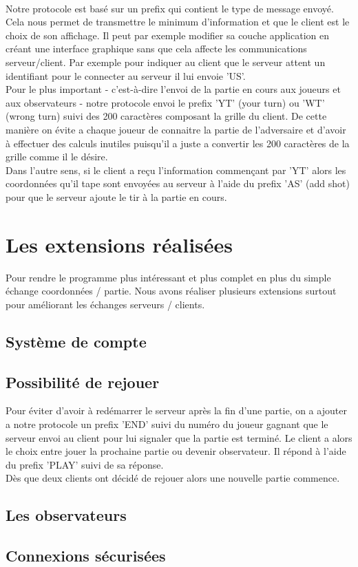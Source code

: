 \documentclass[12pt]{article}
\begin{document}
\textnormal{
\\Notre protocole est basé sur un prefix qui contient le type de message envoyé. Cela nous permet de transmettre le minimum d'information et que le client est le choix de son affichage. Il peut par exemple modifier sa couche application en créant une interface graphique sans que cela affecte les communications serveur/client. Par exemple pour indiquer au client que le serveur attent un identifiant pour le connecter au serveur il lui envoie 'US'.\\
Pour le plus important - c'est-à-dire l'envoi de la partie en cours aux joueurs et aux observateurs - notre protocole envoi le prefix 'YT' (your turn) ou 'WT' (wrong turn) suivi des 200 caractères composant la grille du client. De cette manière on évite a chaque joueur de connaitre la partie de l'adversaire et d'avoir à effectuer des calculs inutiles puisqu'il a juste a convertir les 200 caractères de la grille comme il le désire.\\
Dans l'autre sens, si le client a reçu l'information commençant par 'YT' alors les coordonnées qu'il tape sont envoyées au serveur à l'aide du prefix 'AS' (add shot) pour que le serveur ajoute le tir à la partie en cours.}

\section{Les extensions réalisées}

\textnormal{
Pour rendre le programme plus intéressant et plus complet en plus du simple échange coordonnées / partie. Nous avons réaliser plusieurs extensions surtout pour améliorant les échanges serveurs / clients.
}

\subsection{Système de compte}

\subsection{Possibilité de rejouer}
\textnormal{
Pour éviter d'avoir à redémarrer le serveur après la fin d'une partie, on a ajouter a notre protocole un prefix 'END' suivi du numéro du joueur gagnant que le serveur envoi au client pour lui signaler que la partie est terminé. Le client a alors le choix entre jouer la prochaine partie ou devenir observateur. Il répond à l'aide du prefix 'PLAY' suivi de sa réponse.\\
Dès que deux clients ont décidé de rejouer alors une nouvelle partie commence.
}

\subsection{Les observateurs}

\subsection{Connexions sécurisées}
\end{document}
